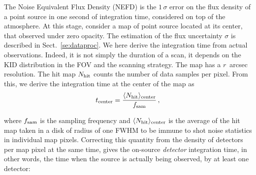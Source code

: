 The Noise Equivalent Flux Density (NEFD) is the $1\,\sigma$ error on the flux
density of a point source in one second of integration time, considered on top
of the atmosphere. At this stage, consider a map of point source located at its
center, that observed under zero opacity. The estimation of the flux uncertainty
$\sigma$ is described in Sect.~\ref{se:dataproc}. We here derive the integration
time from actual observations. Indeed, it is not simply the duration of a scan,
it depends on the KID distribution in the FOV and the scanning strategy. The map
has a $r$~arcsec resolution. The hit map $N_{\rm{hit}}$ counts the number of
data samples per pixel. From this, we derive the integration time at the center
of the map as
%
%
\begin{equation}
t_{\rm{center}} = \frac{\langle N_{\rm{hit}}\rangle_{\rm{center}}}{f_{\rm{sam}}}\,,
\end{equation}

where $f_{\rm{sam}}$ is the sampling frequency and $\langle
N_{\rm{hit}}\rangle_{\rm{center}}$ is the average of the hit map taken in a disk
of radius of one FWHM to be immune to shot noise statistics in individual map
pixels. Correcting this quantity from the density of detectors per map pixel at
the same time, gives the on-source \emph{detector} integration time, in other
words, the time when the source is actually being observed, by at least one
detector:

